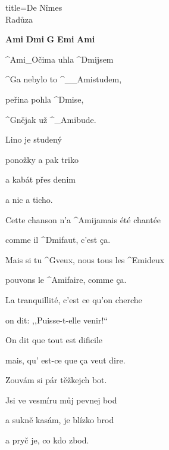 \begin{song}{title=\predtitle\centering De N\^{i}mes \\\large Radůza  \vspace*{-0.3cm}}  %
\begin{centerjustified}

\begin{varwidth}[t]{0.48\textwidth}\setlength{\parindent}{0.45cm}  %

\textbf{Ami\,\,Dmi\,\,G\,\,Emi\,\,Ami}
       
\sloka 
	^{Ami{\color{white}\_}}Očima uhla ^{Dmi}jsem

	^{G}a nebylo to ^{{\color{white}\_\_}Ami}studem,

	peřina pohla ^{Dmi}se,

	^{G}nějak už ^{{\color{white}\_}Ami}bude.

	\phantom{.}

	Lino je studený

	ponožky a pak triko
   	
	a kabát přes denim
	
	a nic a ticho.

	Cette chanson n’a ^{Ami}jamais été chantée

	comme il ^{Dmi}faut, c’est ça.

	Mais si tu ^{G}veux, nous tous les ^{Emi}deux
  
	pouvons le ^{Ami}faire, comme ça.

	\phantom{.}

	La tranquillité, c’est ce qu’on cherche
	
	on dit: ,,Puisse-t-elle venir!``
	
	On dit que tout est dificile

	mais, qu’ est-ce que ça veut dire.

	Zouvám si pár těžkejch bot.
	
	Jsi ve vesmíru můj pevnej bod
	
	a sukně kasám, je blízko brod
	
	a pryč je, co kdo zbod.

\end{varwidth}\mezisloupci\begin{varwidth}[t]{0.48\textwidth}\setlength{\parindent}{0.45cm}
\vspace*{0.375cm}  %

\phantom{.}


\end{varwidth}
\end{centerjustified}
\end{song}
